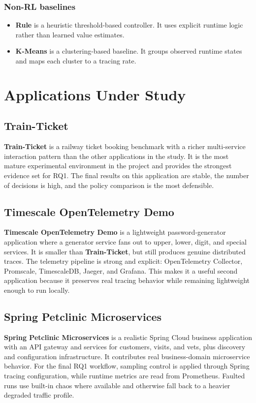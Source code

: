 \documentclass[11pt]{report}
\newcommand{\Rule}{\textbf{Rule}}
\newcommand{\KMeans}{\textbf{K-Means}}
\newcommand{\TT}{\textbf{Train-Ticket}}
\newcommand{\TS}{\textbf{Timescale OpenTelemetry Demo}}
\newcommand{\SP}{\textbf{Spring Petclinic Microservices}}
\begin{document}
\subsection{Non-RL baselines}
\begin{itemize}
    \item \Rule{} is a heuristic threshold-based controller. It uses explicit runtime logic rather than learned value estimates.
    \item \KMeans{} is a clustering-based baseline. It groups observed runtime states and maps each cluster to a tracing rate.
\end{itemize}

\chapter{Applications Under Study}
\section{Train-Ticket}
\TT{} is a railway ticket booking benchmark with a richer multi-service interaction pattern than the other applications in the study. It is the most mature experimental environment in the project and provides the strongest evidence set for RQ1. The final results on this application are stable, the number of decisions is high, and the policy comparison is the most defensible.

\section{Timescale OpenTelemetry Demo}
\TS{} is a lightweight password-generator application where a generator service fans out to upper, lower, digit, and special services. It is smaller than \TT{}, but still produces genuine distributed traces. The telemetry pipeline is strong and explicit: OpenTelemetry Collector, Promscale, TimescaleDB, Jaeger, and Grafana. This makes it a useful second application because it preserves real tracing behavior while remaining lightweight enough to run locally.

\section{Spring Petclinic Microservices}
\SP{} is a realistic Spring Cloud business application with an API gateway and services for customers, visits, and vets, plus discovery and configuration infrastructure. It contributes real business-domain microservice behavior. For the final RQ1 workflow, sampling control is applied through Spring tracing configuration, while runtime metrics are read from Prometheus. Faulted runs use built-in chaos where available and otherwise fall back to a heavier degraded traffic profile.
\end{document}
